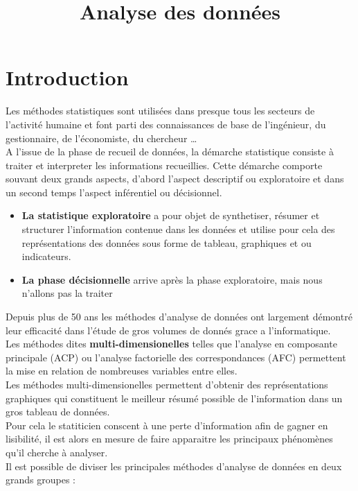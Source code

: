 \documentclass[a4paper]{article}
\title{Analyse des données}
\begin{document}
\maketitle
\tableofcontents
\newpage

\section{Introduction}
Les méthodes statistiques sont utilisées dans presque tous les secteurs de l'activité humaine et font parti des connaissances de base de
l'ingénieur, du gestionnaire, de l'économiste, du chercheur \ldots \\ 
A l'issue de la phase de recueil de données, la démarche statistique consiste à traiter et interpreter les informations recueillies. Cette démarche
comporte souvant deux grands aspects, d'abord l'aspect descriptif ou exploratoire et dans un second temps l'aspect inférentiel ou décisionnel. \\
\begin{itemize}
    \item[] \textbf{La statistique exploratoire} a pour objet de synthetiser, résumer et structurer l'information contenue dans les données et utilise
        pour cela des représentations des données sous forme de tableau, graphiques et ou indicateurs.
    \item[] \textbf{La phase décisionnelle} arrive après la phase exploratoire, mais nous n'allons pas la traiter \\
\end{itemize}
Depuis plus de 50 ans les méthodes d'analyse de données ont largement démontré leur efficacité dans l'étude de gros volumes de donnés grace a
l'informatique. \\
Les méthodes dites \textbf{multi-dimensionelles} telles que l'analyse en composante principale (ACP) ou l'analyse factorielle des correspondances (AFC)
permettent la mise en relation de nombreuses variables entre elles.\\
Les méthodes multi-dimensionelles permettent d'obtenir des représentations graphiques qui constituent le meilleur résumé possible de l'information dans 
un gros tableau de données.\\
Pour cela le statiticien conscent à une perte d'information afin de gagner en lisibilité, il est alors en mesure de faire apparaitre les principaux
phénomènes qu'il cherche à analyser.\\

Il est possible de diviser les principales méthodes d'analyse de données en deux grands groupes : \\
\end{document}
